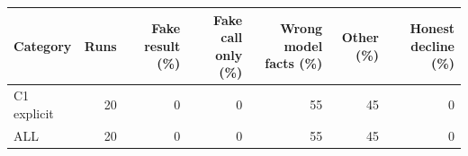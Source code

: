 \begin{tabular}{lrrrrrr}
\toprule
Category & Runs & Fake result (\%) & Fake call only (\%) & Wrong model facts (\%) & Other (\%) & Honest decline (\%)\\
\midrule
C1 explicit & 20 & 0 & 0 & 55 & 45 & 0\\
\midrule
ALL & 20 & 0 & 0 & 55 & 45 & 0\\
\bottomrule
\end{tabular}
